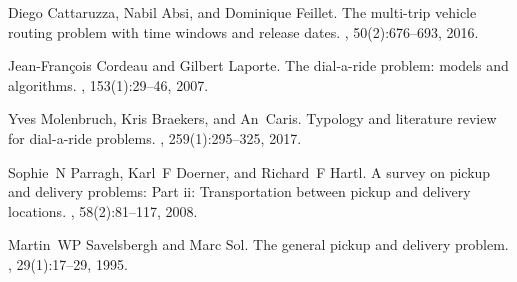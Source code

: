 \documentclass[12pt, a4paper]{article}
\begin{document}
\begin{thebibliography}{1}

Diego Cattaruzza, Nabil Absi, and Dominique Feillet.
\newblock The multi-trip vehicle routing problem with time windows and release
  dates.
, 50(2):676--693, 2016.

Jean-Fran{\c{c}}ois Cordeau and Gilbert Laporte.
\newblock The dial-a-ride problem: models and algorithms.
, 153(1):29--46, 2007.

Yves Molenbruch, Kris Braekers, and An~Caris.
\newblock Typology and literature review for dial-a-ride problems.
, 259(1):295--325, 2017.

Sophie~N Parragh, Karl~F Doerner, and Richard~F Hartl.
\newblock A survey on pickup and delivery problems: Part ii: Transportation
  between pickup and delivery locations.
, 58(2):81--117, 2008.

Martin~WP Savelsbergh and Marc Sol.
\newblock The general pickup and delivery problem.
, 29(1):17--29, 1995.

\end{thebibliography}
\end{document}
